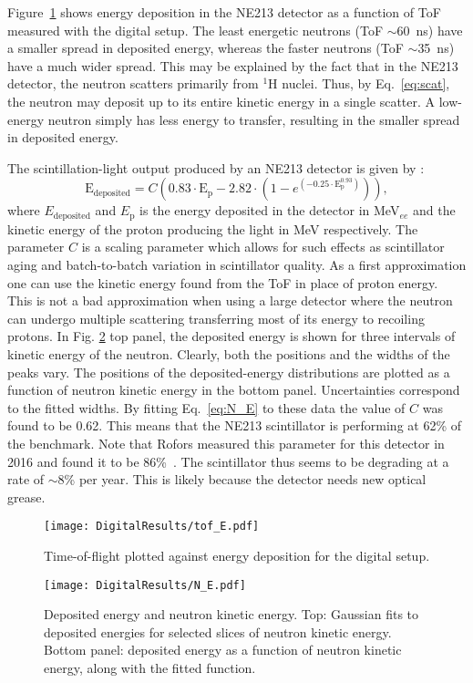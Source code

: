 \documentclass[main.tex]{subfiles}
\begin{document}
Figure~\ref{fig:tof_E_d} shows energy deposition in the NE213 detector as a function of ToF measured with the digital setup. 
The least energetic neutrons (ToF $\sim$\SI{60}{ns}) have a smaller spread in deposited energy, whereas the faster neutrons (ToF $\sim$\SI{35}{ns}) have a much wider spread. 
This may be explained by the fact that in the NE213 detector, the neutron scatters primarily from $^1$H nuclei. Thus, by Eq.~\ref{eq:scat}, the neutron may deposit up to its entire kinetic energy in a single scatter. A low-energy neutron simply has less energy to transfer, resulting in the smaller spread in deposited energy.

The scintillation-light output produced by an NE213 detector is given by \cite{Cecil}:
\begin{equation}
	\textrm{E}_\textrm{deposited} = C\left(  0.83\cdot \textrm{E}_\textrm{p} - 2.82\cdot\left(  1 - e^{(-0.25\cdot \textrm{E}_\textrm{p}^{0.93})}  \right)  \right),
	\label{eq:N_E}
\end{equation}
where $E_\textrm{deposited}$ and $E_\textrm{p}$ is the energy deposited in the detector in \si{MeV}$_{ee}$ and the kinetic energy of the proton producing the light in \si{MeV} respectively. The parameter $C$ is a scaling parameter which allows for such effects as scintillator aging and batch-to-batch variation in scintillator quality. As a first approximation one can use the kinetic energy found from the ToF in place of proton energy. This is not a bad approximation when using a large detector where the neutron can undergo multiple scattering transferring most of its energy to recoiling protons.
In Fig. \ref{fig:N_E} top panel, the deposited energy is shown for three intervals of kinetic energy of the neutron.
Clearly, both the positions and the widths of the peaks vary. 
The positions of the deposited-energy distributions are plotted as a function of neutron kinetic energy in the bottom panel. Uncertainties correspond to the fitted widths. 
By fitting Eq.~\ref{eq:N_E} to these data the value of $C$ was found to be 0.62.  This means that the NE213 scintillator is performing at 62\% of the benchmark. Note that Rofors measured this parameter for this detector in 2016 and found it to be 86\%~\cite{Rofors}. The scintillator thus seems to be degrading at a rate of $\sim$8\% per year. This is likely because the detector needs new optical grease.

\begin{figure}[ht]
    \centering
        \texttt{[image: DigitalResults/tof\_E.pdf]}
        \caption[Time-of-flight plotted against energy deposition for the digital setup.]{Time-of-flight plotted against energy deposition for the digital setup.}
    \label{fig:tof_E_d} 
\end{figure}

\begin{figure}[ht]
    \centering
        \texttt{[image: DigitalResults/N\_E.pdf]}
        \caption[Deposited energy and neutron kinetic energy.]{Deposited energy and neutron kinetic energy. Top: Gaussian fits to deposited energies for selected slices of neutron kinetic energy. Bottom panel: deposited energy as a function of neutron kinetic energy, along with the fitted function.}
    \label{fig:N_E} 
\end{figure}
\end{document}
